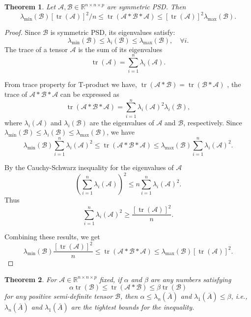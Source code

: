 \documentclass[oupthm]{CUP-JNL-BCM}%
\theoremstyle{oupplain}
\newtheorem{theorem}{Theorem}[section]
\theoremstyle{oupdefinition}
\theoremstyle{oupremark}
\theoremstyle{oupproof}
\newtheorem{proof}{Proof}
\numberwithin{equation}{section}
\begin{document}
\begin{theorem}
    Let $\mathcal{A}, \mathcal{B} \in \mathbb{R}^{n \times n \times p}$ are symmetric PSD. Then 
$$
\lambda_{\min }(\mathcal{B})[\operatorname{tr}(\mathcal{A})]^2 / n \leq \operatorname{tr}(\mathcal{A}* \mathcal{B}* \mathcal{A}) \leq[\operatorname{tr}(\mathcal{A})]^2 \lambda_{\max }(\mathcal{B}) .
$$
\end{theorem}


\begin{proof}
    Since $\mathcal{B}$ is symmetric PSD, its eigenvalues satisfy:
    \[
    \lambda_{\min}(\mathcal{B}) \leq \lambda_i(\mathcal{B}) \leq \lambda_{\max}(\mathcal{B}), \quad \forall i.
    \]
    The trace of a tensor $\mathcal{A}$ is the sum of its eigenvalues
    \[
    \operatorname{tr}(\mathcal{A}) = \sum_{i=1}^n \lambda_i(\mathcal{A}).
    \]
    
\noindent From trace property for T-product we have, $\operatorname{tr}(\mathcal{A}* \mathcal{B})=\operatorname{tr}(\mathcal{B}* \mathcal{A})$ , the trace of $\mathcal{A} * \mathcal{B} * \mathcal{A}$ can be expressed as
    \[
    \operatorname{tr}(\mathcal{A} * \mathcal{B} * \mathcal{A}) = \sum_{i=1}^n \lambda_i(\mathcal{A})^2 \lambda_i(\mathcal{B}),
    \]
    where $\lambda_i(\mathcal{A})$ and $\lambda_i(\mathcal{B})$ are the eigenvalues of $\mathcal{A}$ and $\mathcal{B}$, respectively. Since $\lambda_{\min}(\mathcal{B}) \leq \lambda_i(\mathcal{B}) \leq \lambda_{\max}(\mathcal{B})$, we have
    \[
    \lambda_{\min}(\mathcal{B}) \sum_{i=1}^n \lambda_i(\mathcal{A})^2 \leq \operatorname{tr}(\mathcal{A} * \mathcal{B} * \mathcal{A}) \leq \lambda_{\max}(\mathcal{B}) \sum_{i=1}^n \lambda_i(\mathcal{A})^2.
    \]

    \noindent By the Cauchy-Schwarz inequality for the eigenvalues of $\mathcal{A}$
    \[
    \left(\sum_{i=1}^n \lambda_i(\mathcal{A})\right)^2 \leq n \sum_{i=1}^n \lambda_i(\mathcal{A})^2.
    \]
    Thus
    \[
    \sum_{i=1}^n \lambda_i(\mathcal{A})^2 \geq \frac{[\operatorname{tr}(\mathcal{A})]^2}{n}.
    \]

\noindent Combining these results, we get
    \[
    \lambda_{\min}(\mathcal{B}) \frac{[\operatorname{tr}(\mathcal{A})]^2}{n} \leq \operatorname{tr}(\mathcal{A} * \mathcal{B} * \mathcal{A}) \leq \lambda_{\max}(\mathcal{B}) [\operatorname{tr}(\mathcal{A})]^2.
    \]
\end{proof}

\begin{theorem}
    For $\mathcal{A} \in \mathbb{R}^{n \times n \times p}$ fixed, if $\alpha$ and $\beta$ are any numbers satisfying
    \[
    \alpha \operatorname{tr}(\mathcal{B}) \leq \operatorname{tr}(\mathcal{A} * \mathcal{B}) \leq \beta \operatorname{tr}(\mathcal{B})
    \]
    for any positive semi-definite tensor $\mathcal{B}$, then $\alpha \leq \lambda_n(\bar{A})$ and $\lambda_1(\bar{A}) \leq \beta$, i.e., $\lambda_n(\bar{A})$ and $\lambda_1(\bar{A})$ are the tightest bounds for the inequality.
\end{theorem}
\end{document}
